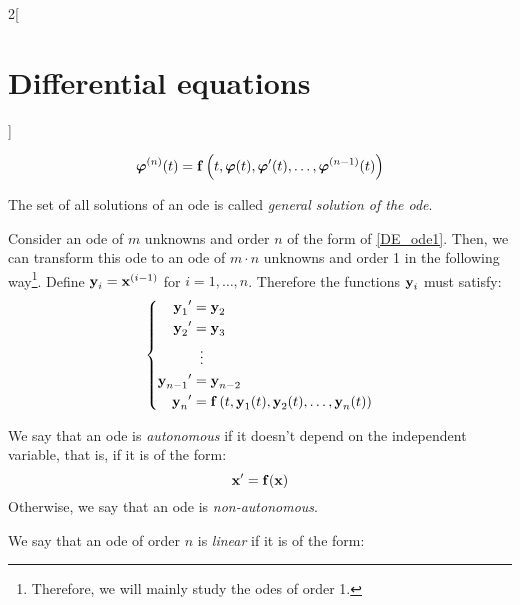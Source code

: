 \documentclass[../../../main.tex]{subfiles}
\begin{document}
\begin{multicols}{2}[\section{Differential equations}]
\begin{definition}
\begin{itemize}
            $$\boldsymbol{\mathrm{\varphi}}^{(n)}(t)=\boldsymbol{\mathrm{f}}\left(t,\boldsymbol{\mathrm{\varphi}}(t),\boldsymbol{\mathrm{\varphi}}'(t),\ldots,\boldsymbol{\mathrm{\varphi}}^{(n-1)}(t)\right)$$
    \end{itemize}
    The set of all solutions of an ode is called \textit{general solution of the ode}.
  \end{definition}
  \begin{prop}
    Consider an ode of $m$ unknowns and order $n$ of the form of \cref{DE_ode1}. Then, we can transform this ode to an ode of $m\cdot n$ unknowns and order 1 in the following way\footnote{Therefore, we will mainly study the odes of order 1.}. Define $\boldsymbol{\mathrm{y}}_i=\boldsymbol{\mathrm{x}}^{(i-1)}$ for $i=1,\ldots,n$. Therefore the functions $\boldsymbol{\mathrm{y}}_i$ must satisfy:
    \begin{equation*}
      \left\{
      \begin{aligned}
        {\boldsymbol{\mathrm{y}}_1}'     & =\boldsymbol{\mathrm{y}}_2                                                                                            \\
        {\boldsymbol{\mathrm{y}}_2}'     & =\boldsymbol{\mathrm{y}}_3                                                                                            \\
                                    & \;\;\vdots                                                                                                       \\
        {\boldsymbol{\mathrm{y}}_{n-1}}' & =\boldsymbol{\mathrm{y}}_{n-2}                                                                                        \\
        {\boldsymbol{\mathrm{y}}_n}'     & =\boldsymbol{\mathrm{f}}\left(t,\boldsymbol{\mathrm{y}}_1(t),\boldsymbol{\mathrm{y}}_2(t),\ldots,\boldsymbol{\mathrm{y}}_n(t)\right) \\
      \end{aligned}
      \right.
    \end{equation*}
  \end{prop}
  \begin{definition}
    We say that an ode is \textit{autonomous} if it doesn't depend on the independent variable, that is, if it is of the form: $$\boldsymbol{\mathrm{x}}'=\boldsymbol{\mathrm{f}}(\boldsymbol{\mathrm{x}})$$ Otherwise, we say that an ode is \textit{non-autonomous}.
  \end{definition}
  \begin{definition}
    We say that an ode of order $n$ is \textit{linear} if it is of the form:

\end{definition}
\end{multicols}
\end{document}
